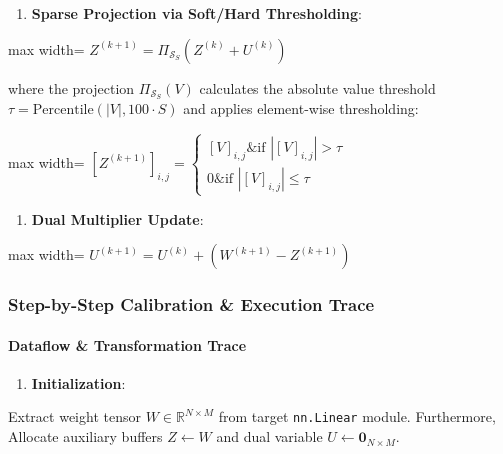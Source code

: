 \begin{enumerate}
\item \textbf{Sparse Projection via Soft/Hard Thresholding}:
\end{enumerate}
\begin{center}
\begin{adjustbox}{max width=\columnwidth}
$\displaystyle
Z^{(k+1)} = \Pi_{\mathcal{S}_S} \left( Z^{(k)} + U^{(k)} \right)
$
\end{adjustbox}
\end{center}
where the projection $\Pi_{\mathcal{S}_S}(V)$ calculates the absolute value threshold $\tau = \text{Percentile}(|V|, 100 \cdot S)$ and applies element-wise thresholding:
\begin{center}
\begin{adjustbox}{max width=\columnwidth}
$\displaystyle
[Z^{(k+1)}]_{i,j} = \begin{cases} [V]_{i,j} \& \text{if } |[V]_{i,j}| > \tau \\ 0 \& \text{if } |[V]_{i,j}| \le \tau \end{cases}
$
\end{adjustbox}
\end{center}

\begin{enumerate}
\item \textbf{Dual Multiplier Update}:
\end{enumerate}
\begin{center}
\begin{adjustbox}{max width=\columnwidth}
$\displaystyle
U^{(k+1)} = U^{(k)} + \left( W^{(k+1)} - Z^{(k+1)} \right)
$
\end{adjustbox}
\end{center}


\subsubsection*{Step-by-Step Calibration \& Execution Trace}

\paragraph{Dataflow \& Transformation Trace}

\begin{enumerate}
\item \textbf{Initialization}:
\end{enumerate}
Extract weight tensor $W \in \mathbb{R}^{N \times M}$ from target \texttt{nn.Linear} module. Furthermore, Allocate auxiliary buffers $Z \leftarrow W$ and dual variable $U \leftarrow \mathbf{0}_{N \times M}$.

